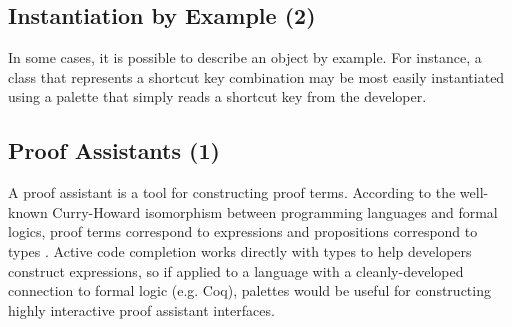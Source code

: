 \documentclass[10pt, conference, compsocconf]{IEEEtran}
\begin{document}

\subsection{Instantiation by Example (2)}
In some cases, it is possible to describe an object by example. For instance, a class that represents a shortcut key combination may be most easily instantiated using a palette that simply reads a shortcut key from the developer.

\subsection{Proof Assistants (1)}
A proof assistant is a tool for constructing proof terms. According to the well-known Curry-Howard isomorphism between programming languages and formal logics, proof terms correspond to expressions and propositions correspond to types \cite{tapl}. Active code completion works directly with types to help developers construct expressions, so if applied to a language with a cleanly-developed connection to formal logic (e.g. Coq), palettes would be useful for constructing highly interactive proof assistant interfaces.

%	
\end{document}
